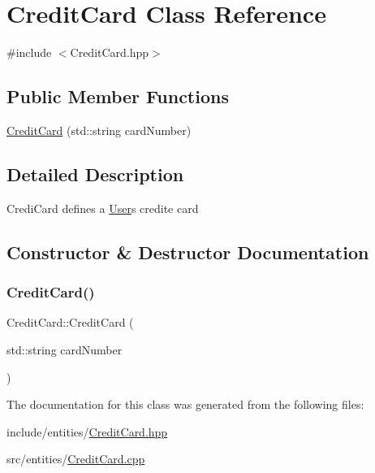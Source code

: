 \hypertarget{class_credit_card}{}\section{Credit\+Card Class Reference}
\label{class_credit_card}


{\ttfamily \#include $<$Credit\+Card.\+hpp$>$}

\subsection*{Public Member Functions}
\begin{DoxyCompactItemize}
\item 
\mbox{\hyperlink{class_credit_card_ae1d0fab3098057b4514355c2173559fd}{Credit\+Card}} (std\+::string card\+Number)
\end{DoxyCompactItemize}


\subsection{Detailed Description}
Credi\+Card defines a \mbox{\hyperlink{class_user}{User}}\textquotesingle{}s credite card 

\subsection{Constructor \& Destructor Documentation}
\mbox{\label{class_credit_card_ae1d0fab3098057b4514355c2173559fd}} 
\subsubsection{\texorpdfstring{CreditCard()}{CreditCard()}}
{\footnotesize\ttfamily Credit\+Card\+::\+Credit\+Card (\begin{DoxyParamCaption}\item[{std\+::string}]{card\+Number }\end{DoxyParamCaption})}



The documentation for this class was generated from the following files\+:\begin{DoxyCompactItemize}
\item 
include/entities/\mbox{\hyperlink{_credit_card_8hpp}{Credit\+Card.\+hpp}}\item 
src/entities/\mbox{\hyperlink{_credit_card_8cpp}{Credit\+Card.\+cpp}}\end{DoxyCompactItemize}
